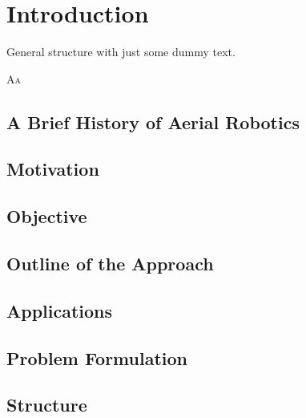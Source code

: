 
\chapter{Introduction}
\label{cp:intro}

\begin{highlight}
    \begin{st}
        General structure with just some dummy text.
    \end{st} 
\end{highlight}

\lettrine{A}{a}


\section{A Brief History of Aerial Robotics}


\section{Motivation}


\section{Objective}


\section{Outline of the Approach}


\section{Applications}


\section{Problem Formulation}
\label{cp:intro:pb}


\section{Structure}

